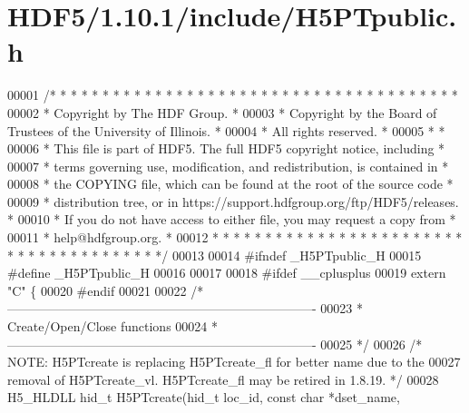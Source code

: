 \hypertarget{_h_d_f5_21_810_81_2include_2_h5_p_tpublic_8h_source}{}\section{H\+D\+F5/1.10.1/include/\+H5\+P\+Tpublic.h}
\label{_h_d_f5_21_810_81_2include_2_h5_p_tpublic_8h_source}

\begin{DoxyCode}
00001 \textcolor{comment}{/* * * * * * * * * * * * * * * * * * * * * * * * * * * * * * * * * * * * * * *}
00002 \textcolor{comment}{ * Copyright by The HDF Group.                                               *}
00003 \textcolor{comment}{ * Copyright by the Board of Trustees of the University of Illinois.         *}
00004 \textcolor{comment}{ * All rights reserved.                                                      *}
00005 \textcolor{comment}{ *                                                                           *}
00006 \textcolor{comment}{ * This file is part of HDF5.  The full HDF5 copyright notice, including     *}
00007 \textcolor{comment}{ * terms governing use, modification, and redistribution, is contained in    *}
00008 \textcolor{comment}{ * the COPYING file, which can be found at the root of the source code       *}
00009 \textcolor{comment}{ * distribution tree, or in https://support.hdfgroup.org/ftp/HDF5/releases.  *}
00010 \textcolor{comment}{ * If you do not have access to either file, you may request a copy from     *}
00011 \textcolor{comment}{ * help@hdfgroup.org.                                                        *}
00012 \textcolor{comment}{ * * * * * * * * * * * * * * * * * * * * * * * * * * * * * * * * * * * * * * */}
00013 
00014 \textcolor{preprocessor}{#ifndef \_H5PTpublic\_H}
00015 \textcolor{preprocessor}{#define \_H5PTpublic\_H}
00016 
00017 
00018 \textcolor{preprocessor}{#ifdef \_\_cplusplus}
00019 \textcolor{keyword}{extern} \textcolor{stringliteral}{"C"} \{
00020 \textcolor{preprocessor}{#endif}
00021 
00022 \textcolor{comment}{/*-------------------------------------------------------------------------}
00023 \textcolor{comment}{ * Create/Open/Close functions}
00024 \textcolor{comment}{ *-------------------------------------------------------------------------}
00025 \textcolor{comment}{ */}
00026 \textcolor{comment}{/* NOTE: H5PTcreate is replacing H5PTcreate\_fl for better name due to the}
00027 \textcolor{comment}{   removal of H5PTcreate\_vl.  H5PTcreate\_fl may be retired in 1.8.19. */}
00028 H5\_HLDLL hid\_t H5PTcreate(hid\_t loc\_id, \textcolor{keyword}{const} \textcolor{keywordtype}{char} *dset\_name,

\end{DoxyCode}
